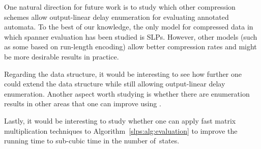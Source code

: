 


One natural direction for future work is to study which other compression schemes allow output-linear delay enumeration for evaluating annotated automata. To the best of our knowledge, the only model for compressed data in which spanner evaluation has been studied is SLPs. However, other models (such as some based on run-length encoding) allow better compression rates and might be more desirable results in practice.

Regarding the \dsabbr data structure, it would be interesting to see how further one could extend the data structure while still allowing output-linear delay enumeration. Another aspect worth studying is whether there are enumeration results in other areas that one can improve using \dsabbr.


Lastly, it would be interesting to study whether one can apply fast matrix multiplication techniques to Algorithm~\ref{slps:alg:evaluation} to improve the running time to sub-cubic time in the number of~states.

